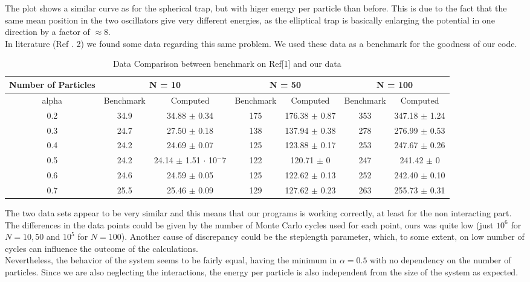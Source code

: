 \documentclass[10pt,a4paper,titlepage]{article}
\begin{document}
The plot shows a similar curve as for the spherical trap, but with higer energy per particle than before. This is due to the fact that the same mean position in the two oscillators give very different energies, as the elliptical trap is basically enlarging the potential in one direction by a factor of $\approx 8$.\\
In literature (Ref . 2) we found some data regarding this same problem. We used these data as a benchmark for the goodness of our code. 
\begin{table}[H]
\caption{{\footnotesize Data Comparison between benchmark on Ref[1] and our data }}
\begin{center}
\begin{tabular}[t]{c c c c c c c }
\hline
Number of Particles & \multicolumn{2}{c}{N = 10 }  & \multicolumn{2}{c}{N = 50 }     &  \multicolumn{2}{c}{N = 100 }  \\\hline
alpha &  Benchmark  &  Computed  &  Benchmark  &  Computed  &  Benchmark  &  Computed  \\\hline
0.2   & 34.9   & 34.88 $\pm$ 0.34 & 175   & 176.38 $\pm$ 0.87 &       353 & 347.18 $\pm$ 1.24 \\
0.3   & 24.7   & 27.50 $\pm$ 0.18 & 138   & 137.94 $\pm$ 0.38 &      278 & 276.99 $\pm$ 0.53 \\
0.4   & 24.2   & 24.69 $\pm$ 0.07 & 125   & 123.88 $\pm$ 0.17 &      253 & 247.67 $\pm$ 0.26 \\
0.5   & 24.2   & 24.14 $\pm$ 1.51 $\cdot$ 10$^-7$ & 122   & 120.71 $\pm$ 0 &      247 & 241.42 $\pm$ 0    \\
0.6   & 24.6   & 24.59 $\pm$ 0.05 & 125   & 122.62 $\pm$ 0.13 &      252 & 242.40 $\pm$ 0.10 \\
0.7   & 25.5   & 25.46 $\pm$ 0.09 & 129   & 127.62 $\pm$ 0.23 &      263 & 255.73 $\pm$ 0.31 \\\hline

\end{tabular}
\end{center}
\end{table}
\noindent The two data sets appear to be very similar and this means that our programs is working correctly, at least for the non interacting part. The differences in the data points could be given by the number of Monte Carlo cycles used for each point, ours was quite low (just $10^6$ for $N=10,50$ and $10^5$ for $N=100$). Another cause of discrepancy could be the steplength parameter, which, to some extent, on low number of cycles can influence the outcome of the calculations. \\
Nevertheless, the behavior of the system seems to be fairly equal, having the minimum in $\alpha = 0.5$ with no dependency on the number of particles. Since we are also neglecting the interactions, the energy per particle is also independent from the size of the system as expected.\\
\end{document}
